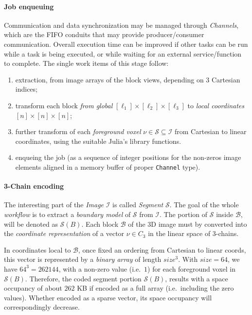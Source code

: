 \paragraph{Job enqueuing} Communication and data synchronization may be managed through \emph{Channels}, which are the FIFO conduits that may provide producer/consumer communication. Overall execution time can be improved if other tasks can be run while a task is being executed, or while waiting for an external service/function to complete. The single work items of this stage follow:
\begin{enumerate}

\item extraction, from image arrays of the block views, depending on 3 Cartesian indices;

\item transform  each block \emph{from global} $[\ell_1]\times[\ell_2]\times[\ell_3]$ to \emph{local coordinates} $[n]\times[n]\times[n]$;

\item further transform of each \emph{foreground voxel} $\nu\in\mathcal{S}\subseteq\mathcal{I}$ from Cartesian to linear coordinates, using the suitable Julia's library functions.

\item enqueing the job (as a sequence of integer positions for the non-zeros image elements aligned in a memory buffer of proper \texttt{Channel} type).
\end{enumerate}

\paragraph{3-Chain encoding} 
The interesting part of the \emph{Image} $\mathcal{I}$ is called \emph{Segment} $\mathcal{S}$. The goal of the whole \emph{workflow} is to extract a \emph{boundary model} of $\mathcal{S}$ from $\mathcal{I}$. The portion of $\mathcal{S}$ inside $\mathcal{B}$, will be denoted as $\mathcal{S}(B)$.
Each block $\mathcal{B}$ of the 3D image must by converted into the \emph{coordinate representation} of a vector $\nu\in C_3$ in the linear space  of 3-chains. 

In coordinates local to $\mathcal{B}$, once fixed an ordering from Cartesian to linear coords, this vector is represented by a \emph{binary array} of length $size^3$. With $size=64$, we have $64^3=262144$,  with a non-zero value (i.e.~$1$) for each foreground voxel in $\mathcal{S}(B)$. Therefore, the coded segment portion $\mathcal{S}(B)$, results with a space occupancy of about $262$ KB if encoded as a full array (i.e.~including the zero values). Whether encoded as a sparse vector, its space occupancy will correspondingly decrease.

